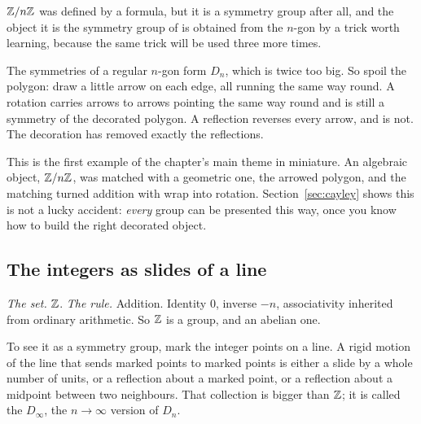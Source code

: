 $\mathbb{Z}/n\mathbb{Z}$ was defined by a formula, but it is a symmetry group after all, and the object it is the
symmetry group of is obtained from the $n$-gon by a trick worth learning, because the same trick
will be used three more times.

The symmetries of a regular $n$-gon form $D_n$, which is twice too big. So spoil the polygon: draw
a little arrow on each edge, all running the same way round. A rotation carries arrows to arrows
pointing the same way round and is still a symmetry of the decorated polygon. A reflection reverses
every arrow, and is not. The decoration has removed exactly the reflections.




\begin{bigpic}
This is the first example of the chapter's main theme in miniature. An algebraic object, $\mathbb{Z}/n\mathbb{Z}$,
was matched with a geometric one, the arrowed polygon, and the matching turned addition with wrap
into rotation. Section~\ref{sec:cayley} shows this is not a lucky accident: \emph{every} group can
be presented this way, once you know how to build the right decorated object.
\end{bigpic}

\subsection{The integers as slides of a line}\label{sec:Z}

\emph{The set.} $\mathbb{Z}$. \emph{The rule.} Addition. Identity $0$, inverse $-n$, associativity
inherited from ordinary arithmetic. So $\mathbb{Z}$ is a group, and an abelian one.

To see it as a symmetry group, mark the integer points on a line. A rigid motion of the line that
sends marked points to marked points is either a slide by a whole number of units, or a reflection
about a marked point, or a reflection about a midpoint between two neighbours. That collection is
bigger than $\mathbb{Z}$; it is called the  $D_\infty$, the $n\to\infty$
version of $D_n$.



